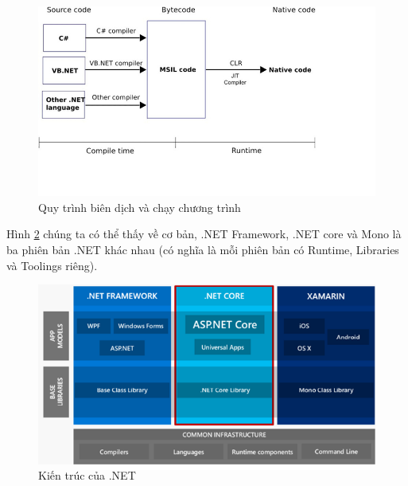 \begin{center}
    \begin{figure}[h]
    \begin{center}
     \includegraphics[scale=0.6]{image/chayDotNet.png}
    \end{center}
    \caption{Quy trình biên dịch và chạy chương trình}
    \label{refhinh2_2}
    \end{figure}
\end{center}
Hình \ref{refhinh2_3} chúng ta có thể thấy về cơ bản, .NET Framework, .NET core và Mono là ba phiên bản .NET khác nhau (có nghĩa là mỗi phiên bản có Runtime, Libraries và Toolings riêng).
\begin{center}
    \begin{figure}[h]
    \begin{center}
     \includegraphics[scale=0.9]{image/kienTrucDotNetCore.png}
    \end{center}
    \caption{Kiến trúc của .NET }
    \label{refhinh2_3}
    \end{figure}
\end{center}
